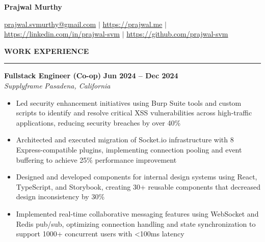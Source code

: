 \documentclass[10pt,letterpaper]{article}
\begin{document}
{\centering\huge\textbf{Prajwal Murthy}\par}
\vspace{2mm}
{\centering\small{\href{mailto:prajwal.murthy@gmail.com}{prajwal.svmurthy@gmail.com} $|$ \href{https://prajwal.me}{https://prajwal.me} $|$ \href{https://linkedin.com/in/prajwal-svm}{https://linkedin.com/in/prajwal-svm} $|$ \href{https://github.com/prajwal-svm}{https://github.com/prajwal-svm}}\par}
\vspace{2mm}

{\hspace{0in}\small\textbf{WORK EXPERIENCE}}\par
\vspace{-2mm}
\noindent\rule{\textwidth}{0.1pt}
\vspace{-4mm}

\hspace{0in}\textbf{Fullstack Engineer (Co-op)} \hfill \textbf{Jun 2024 -- Dec 2024}\\
\hspace{0in}\textit{Supplyframe} \hfill \textit{Pasadena, California}
\begin{itemize}[leftmargin=0.15in,nosep,topsep=3pt]
    \item Led security enhancement initiatives using Burp Suite tools and custom scripts to identify and resolve critical XSS vulnerabilities across high-traffic applications, reducing security breaches by over 40\%
    \item Architected and executed migration of Socket.io infrastructure with 8 Express-compatible plugins, implementing connection pooling and event buffering to achieve 25\% performance improvement
    \item Designed and developed components for internal design systems using React, TypeScript, and Storybook, creating 30+ reusable components that decreased design inconsistency by 30\%
    \item Implemented real-time collaborative messaging features using WebSocket and Redis pub/sub, optimizing connection handling and state synchronization to support 1000+ concurrent users with <100ms latency
\end{itemize}
\end{document}
